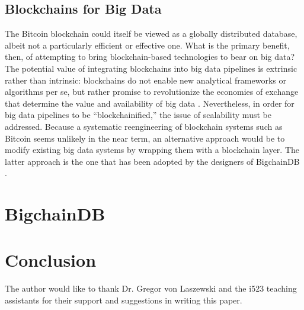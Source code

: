 \documentclass[sigconf]{acmart}
\begin{document}
\subsection{Blockchains for Big Data}
The Bitcoin blockchain could itself be viewed as a globally distributed database, albeit not a particularly efficient or effective one. What is the primary benefit, then, of attempting to bring blockchain-based technologies to bear on big data? The potential value of integrating blockchains into big data pipelines is extrinsic rather than intrinsic: blockchains do not enable new analytical frameworks or algorithms per se, but rather promise to revolutionize the economies of exchange that determine the value and availability of big data \cite{tMBD16}. Nevertheless, in order for big data pipelines to be ``blockchainified,'' the issue of scalability must be addressed. Because a systematic reengineering of blockchain systems such as Bitcoin seems unlikely in the near term, an alternative approach would be to modify existing big data systems by wrapping them with a blockchain layer. The latter approach is the one that has been adopted by the designers of BigchainDB \cite{bigDB16}.

\section{BigchainDB}

\blindtext
\blindtext

\blindtext

\blindtext
\blindtext

\blindtext
\blindtext

\section{Conclusion}

\blindtext
\blindtext

\begin{acks}
The author would like to thank Dr. Gregor von Laszewski and the i523 teaching assistants for their support and suggestions in writing this paper.
\end{acks}


 
\end{document}
